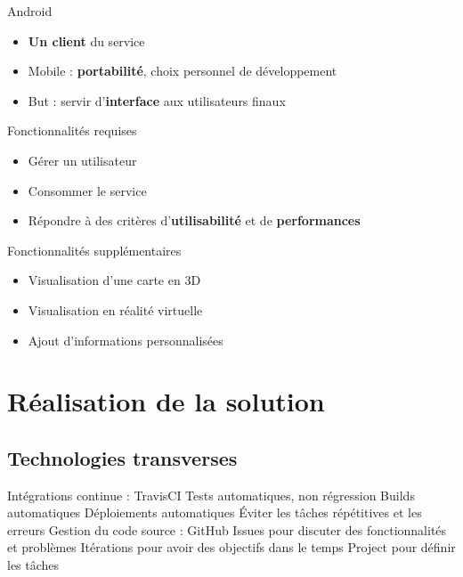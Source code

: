\documentclass{beamer} %
\begin{document}
  \begin{frame}{\subsecname}
    \begin{block}{Android}
      \begin{itemize}
        \item \textbf{Un client} du service
        \item Mobile : \textbf{portabilité}, choix personnel de développement
        \item But : servir d'\textbf{interface} aux utilisateurs finaux
      \end{itemize}
    \end{block}

    \begin{alertblock}{Fonctionnalités requises}
      \begin{itemize}
        \item Gérer un utilisateur
        \item Consommer le service
        \item Répondre à des critères d'\textbf{utilisabilité} et de \textbf{performances}
      \end{itemize}
    \end{alertblock}

    \begin{exampleblock}{Fonctionnalités supplémentaires}
      \begin{itemize}
        \item Visualisation d'une carte en 3D
        \item Visualisation en réalité virtuelle
        \item Ajout d'informations personnalisées
      \end{itemize}
    \end{exampleblock}

  \end{frame}


  \section{Réalisation de la solution}
  \subsection{Technologies transverses}
  \begin{frame}{\subsecname}
    Intégrations continue :
    TravisCI
    Tests automatiques, non régression
    Builds automatiques
    Déploiements automatiques
    Éviter les tâches répétitives et les erreurs
    Gestion du code source :
    GitHub
    Issues pour discuter des fonctionnalités et problèmes
    Itérations pour avoir des objectifs dans le temps
    Project pour définir les tâches  
  \end{frame}
\end{document}

